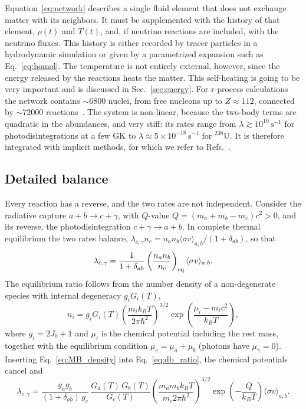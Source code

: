 Equation~\ref{eq:network} describes a single fluid element that does not exchange matter with its neighbors.
It must be supplemented with the history of that element, $\rho(t)$ and $T(t)$, and, if neutrino reactions are included, with the neutrino fluxes.
This history is either recorded by tracer particles in a hydrodynamic simulation or given by a parametrized expansion such as Eq.~\ref{eq:homol}.
The temperature is not entirely external, however, since the energy released by the reactions heats the matter.
This self-heating is going to be very important and is discussed in Sec.~\ref{sec:energy}.
For r-process calculations the network contains $\sim6800$ nuclei, from free nucleons up to $Z\approx112$, connected by $\sim72000$ reactions~\cite{reichert_nuclear_2023}.
The system is non-linear, because the two-body terms are quadratic in the abundances, and very stiff: its rates range from $\lambda\gtrsim10^{10}\,\mathrm{s^{-1}}$ for photodisintegrations at a few GK to $\lambda\approx5\times10^{-18}\,\mathrm{s^{-1}}$ for ${}^{238}$U.
It is therefore integrated with implicit methods, for which we refer to Refs.~\cite{hix_computational_1999,lippuner_skynet_2017,reichert_nuclear_2023}.

\subsection{Detailed balance}\label{sec:detailed_balance}

Every reaction has a reverse, and the two rates are not independent.
Consider the radiative capture $a+b\to c+\gamma$, with $Q$-value $Q=(m_a+m_b-m_c)c^2>0$, and its reverse, the photodisintegration $c+\gamma\to a+b$.
In complete thermal equilibrium the two rates balance, $\lambda_{c,\gamma}n_c=n_an_b\langle\sigma v\rangle_{a,b}/(1+\delta_{ab})$, so that
\begin{equation}\label{eq:db_ratio}
  \lambda_{c,\gamma}=\frac{1}{1+\delta_{ab}}\left(\frac{n_an_b}{n_c}\right)_{\rm eq}\langle\sigma v\rangle_{a,b}.
\end{equation}
The equilibrium ratio follows from the number density of a non-degenerate species with internal degeneracy $g_iG_i(T)$,
\begin{equation}\label{eq:MB_density}
  n_i=g_iG_i(T)\left(\frac{m_ik_BT}{2\pi\hbar^2}\right)^{3/2}\exp\left(\frac{\mu_i-m_ic^2}{k_BT}\right),
\end{equation}
where $g_i=2J_0+1$ and $\mu_i$ is the chemical potential including the rest mass, together with the equilibrium condition $\mu_c=\mu_a+\mu_b$ (photons have $\mu_\gamma=0$).
Inserting Eq.~\ref{eq:MB_density} into Eq.~\ref{eq:db_ratio}, the chemical potentials cancel and
\begin{equation}\label{eq:detailed_balance}
  \lambda_{c,\gamma}=\frac{g_ag_b}{(1+\delta_{ab})\,g_c}\,\frac{G_a(T)\,G_b(T)}{G_c(T)}\left(\frac{m_am_bk_BT}{m_c2\pi\hbar^2}\right)^{3/2}\exp\left(-\frac{Q}{k_BT}\right)\langle\sigma v\rangle_{a,b}.
\end{equation}

